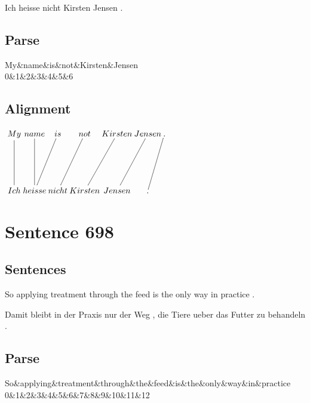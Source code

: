 \documentclass{report}
\begin{document}
\noindent Ich heisse nicht Kirsten Jensen .



\subsection*{Parse}
\begin{dependency}[theme=simple]
\begin{deptext}[column sep=.5cm, row sep=.1ex]
My\&name\&is\&not\&Kirsten\&Jensen\\
0\&1\&2\&3\&4\&5\&6\\
\end{deptext}
\end{dependency}


\subsection*{Alignment}
\scriptsize{
$
\xymatrix@C-2.3pc{
My \ar @{-} [dd] & name \ar @{-} [dd] & is \ar @{-} [ddl] & not \ar @{-} [ddl] & Kirsten \ar @{-} [ddl] & Jensen \ar @{-} [ddl] & . \ar @{-} [ddl]\\\\
Ich & heisse & nicht & Kirsten & Jensen & .
}$}
\newpage\section*{Sentence 698}

\subsection*{Sentences}
So applying treatment through the feed is the only way in practice .

\noindent Damit bleibt in der Praxis nur der Weg , die Tiere ueber das Futter zu behandeln .



\subsection*{Parse}
\begin{dependency}[theme=simple]
\begin{deptext}[column sep=.5cm, row sep=.1ex]
So\&applying\&treatment\&through\&the\&feed\&is\&the\&only\&way\&in\&practice\\
0\&1\&2\&3\&4\&5\&6\&7\&8\&9\&10\&11\&12\\
\end{deptext}
\end{dependency}
\end{document}
